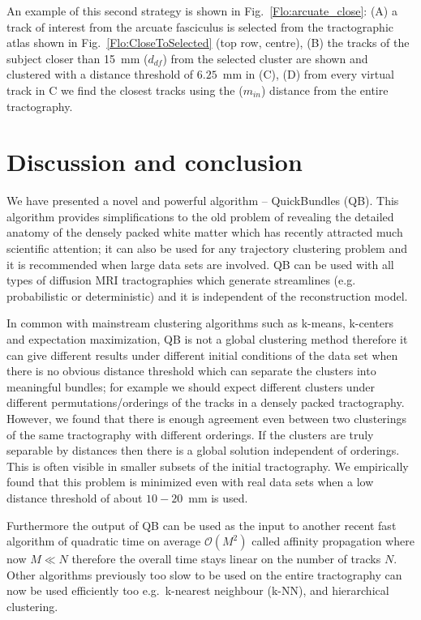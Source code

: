 \documentclass[journal]{IEEEtran}
\begin{document}
An example of this second strategy is shown in
Fig.~\ref{Flo:arcuate_close}: (A) a track of interest from the arcuate
fasciculus is selected from the tractographic atlas shown in
Fig.~\ref{Flo:CloseToSelected} (top row, centre), (B) the tracks of the
subject closer than 15~mm ($d_{df}$) from the selected cluster are shown
and clustered with a distance threshold of $6.25$~mm in (C), (D) from
every virtual track in C we find the closest tracks using the
($m_{in}$) distance from the entire tractography.

\section{Discussion and conclusion}

We have presented a novel and powerful algorithm -- QuickBundles
(QB). This algorithm provides simplifications to the old problem of
revealing the detailed anatomy of the densely packed white matter which
has recently attracted much scientific attention; it can also be used
for any trajectory clustering problem and it is recommended when large
data sets are involved. QB can be used with all types of diffusion MRI
tractographies which generate streamlines (e.g. probabilistic or
deterministic) and it is independent of the reconstruction model.

In common with mainstream clustering algorithms such as k-means,
k-centers and expectation maximization, QB is not a global clustering
method therefore it can give different results under different initial
conditions of the data set when there is no obvious distance threshold
which can separate the clusters into meaningful bundles; for example we
should expect different clusters under different permutations/orderings
of the tracks in a densely packed tractography. However, we found that
there is enough agreement even between two clusterings of the same
tractography with different orderings. If the clusters are truly
separable by distances then there is a global solution independent of
orderings. This is often visible in smaller subsets of the initial
tractography. We empirically found that this problem is minimized even
with real data sets when a low distance threshold of about $10-20$~mm is
used.

Furthermore the output of QB can be used as the input to another recent
fast algorithm of quadratic time on average $\mathcal{O}(M^{2})$ called affinity
propagation where now $M\ll N$ therefore the overall time stays linear
on the number of tracks $N$. Other algorithms previously too slow to be
used on the entire tractography can now be used efficiently too
e.g.~k-nearest neighbour (k-NN), and hierarchical clustering.
\end{document}
